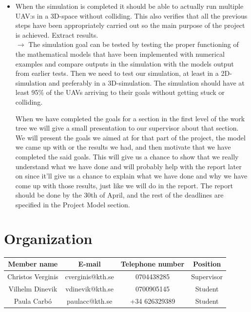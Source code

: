 \documentclass{article}
\begin{document}
\begin{itemize}
		\item When the simulation is completed it should be able to actually run multiple UAV:s in a 3D-space without colliding. This also verifies that all the previous steps have been appropriately carried out so the main purpose of the project is achieved. Extract results. \\
		$\rightarrow$ The simulation goal can be tested by testing the proper functioning of the mathematical models that have been implemented with numerical examples and compare outputs in the simulation with the models output from earlier tests. Then we need to test our simulation, at least in a 2D-simulation and preferably in a 3D-simulation. The simulation should have at least 95\% of the UAVs arriving to their goals without getting stuck or colliding. 
		
		\vspace{2em}
		 When we have completed the goals for a section in the first level of the work tree we will give a small presentation to our supervisor about that section. We will present the goals we aimed at for that part of the project, the model we came up with or the results we had, and then motivate that we have completed the said goals. This will give us a chance to show that we really understand what we have done and will probably help with the report later on since it'll give us a chance to explain what we have done and why we have come up with those results, just like we will do in the report. The report should be done by the 30th of April, and the rest of the deadlines are specified in the Project Model section.
	\end{itemize}
	\vspace{2em}
	\section{Organization}
	\begin{center}
		\begin{tabular}{|c|c|c|c|} \hline
			Member name & E-mail & Telephone number & Position \\ \hline
			Christos Verginis & cverginis@kth.se & 0704438285 & Supervisor \\ \hline
			Vilhelm Dinevik & vdinevik@kth.se & 0700905145 & Student\\ \hline
			Paula Carbó & paulacc@kth.se & +34 626329389 & Student\\ \hline
		\end{tabular}
	\end{center}
	\newpage
	
\end{document}
